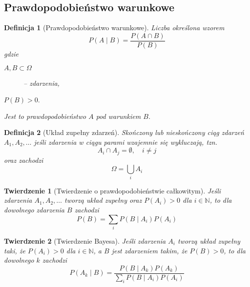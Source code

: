 \documentclass[11pt, leqno]{scrartcl}
\theoremstyle{mydefinition}
\newtheorem{definition}{Definicja}[subsection]
\theoremstyle{mytheorem}
\newtheorem{theorem}{Twierdzenie}[subsection]
\begin{document}
    \subsection{Prawdopodobieństwo warunkowe}
    \begin{definition}[Prawdopodobieństwo warunkowe]
        Liczba określona wzorem
        \[
            P(A \mid B)=\frac{P(A \cap B)}{P(B)}
        \]
        gdzie
        \begin{description}
            \item[$A,B \subset \Omega$] -- zdarzenia,
            \item[$P(B)>0$.]
        \end{description}
        Jest to prawdopodobieństwo $A$ pod warunkiem $B$.
    \end{definition}
    \begin{definition}[Układ zupełny zdarzeń]
        Skończony lub nieskończony ciąg zdarzeń $A_1,A_2,\ldots$ jeśli
        zdarzenia w ciągu parami wzajemnie się wykluczają, tzn.
        \[
            A_i \cap A_j =\emptyset, \quad i \neq j
        \]
        oraz zachodzi
        \[
            \Omega=\bigcup_{i}A_i
        \]
    \end{definition}
    \begin{theorem}[Twierdzenie o prawdopodobieństwie całkowitym]
        Jeśli zdarzenia $A_1,A_2,\ldots$ tworzą układ zupełny oraz
        $P(A_i)>0$ dla $i \in \mathbb{N}$, to dla dowolnego
        zdarzenia $B$ zachodzi
        \[
            P(B)=\sum_{i}P(B \mid A_i)P(A_i)
        \]
    \end{theorem}
    \begin{theorem}[Twierdzenie Bayesa]
        Jeśli zdarzenia $A_i$ tworzą układ zupełny taki, że
        $P(A_i)>0$ dla $i \in \mathbb{N}$, a $B$ jest zdarzeniem
        takim, że $P(B)>0$, to dla dowolnego $k$ zachodzi
        \[
            P(A_k \mid B)=\frac{P(B \mid A_k)P(A_k)}
            {\sum_{i}P(B \mid A_i)P(A_i)}
        \]
    \end{theorem}
    
\end{document}
